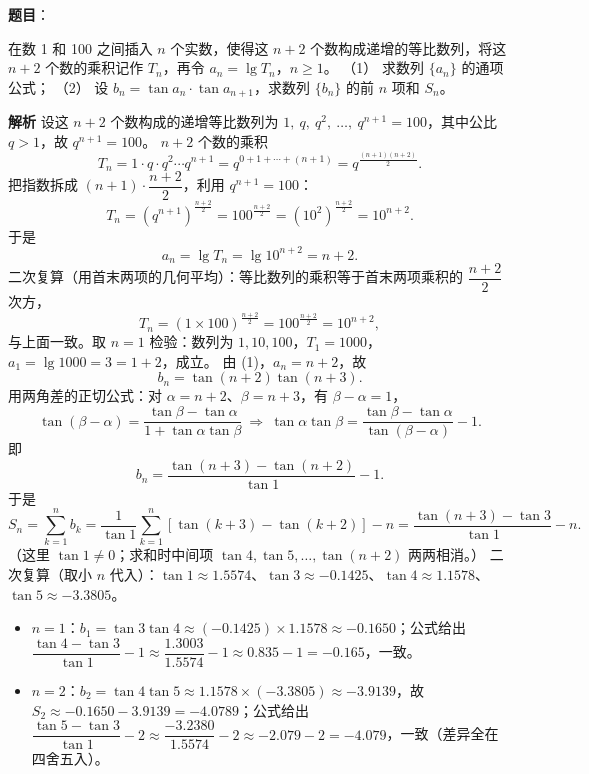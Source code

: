 \begin{answer}


\end{answer}
\begin{answer}

\textbf{题目}：

在数 1 和 100 之间插入 $n$ 个实数，使得这 $n+2$ 个数构成递增的等比数列，将这 $n+2$ 个数的乘积记作 $T_n$，再令 $a_n=\lg T_n$，$n\geqslant1$。
（1） 求数列 $\{a_n\}$ 的通项公式；
（2） 设 $b_n=\tan a_n\cdot\tan a_{n+1}$，求数列 $\{b_n\}$ 的前 $n$ 项和 $S_n$。

\textbf{解析}
设这 $n+2$ 个数构成的递增等比数列为 $1,\ q,\ q^2,\ \dots,\ q^{n+1}=100$，其中公比 $q>1$，故 $q^{n+1}=100$。
$n+2$ 个数的乘积
\nopagebreak[4]
\[
T_n=1\cdot q\cdot q^2\cdots q^{n+1}=q^{0+1+\cdots+(n+1)}=q^{\frac{(n+1)(n+2)}{2}}.
\]
把指数拆成 $(n+1)\cdot\dfrac{n+2}{2}$，利用 $q^{n+1}=100$：
\nopagebreak[4]
\[
T_n=\left(q^{n+1}\right)^{\frac{n+2}{2}}=100^{\frac{n+2}{2}}=\left(10^2\right)^{\frac{n+2}{2}}=10^{n+2}.
\]
于是
\nopagebreak[4]
\[
a_n=\lg T_n=\lg10^{n+2}=n+2.
\]
二次复算（用首末两项的几何平均）：等比数列的乘积等于首末两项乘积的 $\dfrac{n+2}{2}$ 次方，
\nopagebreak[4]
\[
T_n=\left(1\times100\right)^{\frac{n+2}{2}}=100^{\frac{n+2}{2}}=10^{n+2},
\]
与上面一致。取 $n=1$ 检验：数列为 $1,10,100$，$T_1=1000$，$a_1=\lg1000=3=1+2$，成立。
由 (1)，$a_n=n+2$，故
\nopagebreak[4]
\[
b_n=\tan(n+2)\tan(n+3).
\]
用两角差的正切公式：对 $\alpha=n+2$、$\beta=n+3$，有 $\beta-\alpha=1$，
\nopagebreak[4]
\[
\tan(\beta-\alpha)=\frac{\tan\beta-\tan\alpha}{1+\tan\alpha\tan\beta}
\ \Longrightarrow\
\tan\alpha\tan\beta=\frac{\tan\beta-\tan\alpha}{\tan(\beta-\alpha)}-1.
\]
即
\nopagebreak[4]
\[
b_n=\frac{\tan(n+3)-\tan(n+2)}{\tan1}-1.
\]
于是
\nopagebreak[4]
\[
S_n=\sum_{k=1}^{n}b_k
=\frac{1}{\tan1}\sum_{k=1}^{n}\left[\tan(k+3)-\tan(k+2)\right]-n
=\frac{\tan(n+3)-\tan3}{\tan1}-n.
\]
（这里 $\tan1\neq0$；求和时中间项 $\tan4,\tan5,\dots,\tan(n+2)$ 两两相消。）
二次复算（取小 $n$ 代入）：$\tan1\approx1.5574$、$\tan3\approx-0.1425$、$\tan4\approx1.1578$、$\tan5\approx-3.3805$。
\begin{itemize}
\item $n=1$：$b_1=\tan3\tan4\approx(-0.1425)\times1.1578\approx-0.1650$；公式给出 $\dfrac{\tan4-\tan3}{\tan1}-1\approx\dfrac{1.3003}{1.5574}-1\approx0.835-1=-0.165$，一致。
\item $n=2$：$b_2=\tan4\tan5\approx1.1578\times(-3.3805)\approx-3.9139$，故 $S_2\approx-0.1650-3.9139=-4.0789$；公式给出 $\dfrac{\tan5-\tan3}{\tan1}-2\approx\dfrac{-3.2380}{1.5574}-2\approx-2.079-2=-4.079$，一致（差异全在四舍五入）。
\end{itemize}



\end{answer}